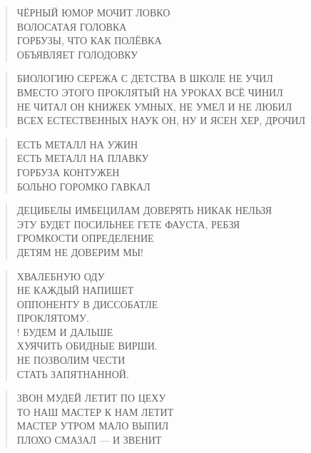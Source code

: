 \poemtitle{***}
\begin{verse}
ЧЁРНЫЙ ЮМОР МОЧИТ ЛОВКО\\
ВОЛОСАТАЯ ГОЛОВКА\\
ГОРБУЗЫ, ЧТО КАК ПОЛЁВКА\\
ОБЪЯВЛЯЕТ ГОЛОДОВКУ
\end{verse}

\poemtitle{***}
\begin{verse}
БИОЛОГИЮ СЕРЕЖА С ДЕТСТВА В ШКОЛЕ НЕ УЧИЛ\\
ВМЕСТО ЭТОГО ПРОКЛЯТЫЙ НА УРОКАХ ВСЁ ЧИНИЛ\\
НЕ ЧИТАЛ ОН КНИЖЕК УМНЫХ, НЕ УМЕЛ И НЕ ЛЮБИЛ\\
ВСЕХ ЕСТЕСТВЕННЫХ НАУК ОН, НУ И ЯСЕН ХЕР, ДРОЧИЛ
\end{verse}

\poemtitle{***}
\begin{verse}
ЕСТЬ МЕТАЛЛ НА УЖИН\\
ЕСТЬ МЕТАЛЛ НА ПЛАВКУ\\
ГОРБУЗА КОНТУЖЕН\\
БОЛЬНО ГОРОМКО ГАВКАЛ
\end{verse}

\poemtitle{***}
\begin{verse}
ДЕЦИБЕЛЫ ИМБЕЦИЛАМ ДОВЕРЯТЬ НИКАК НЕЛЬЗЯ\\
ЭТУ БУДЕТ ПОСИЛЬНЕЕ ГЕТЕ ФАУСТА, РЕБЗЯ\\
ГРОМКОСТИ ОПРЕДЕЛЕНИЕ\\
ДЕТЯМ НЕ ДОВЕРИМ МЫ!
\end{verse}

\poemtitle{***}
\begin{verse}
ХВАЛЕБНУЮ ОДУ \\
НЕ КАЖДЫЙ НАПИШЕТ\\
ОППОНЕНТУ В ДИССОБАТЛЕ\\
ПРОКЛЯТОМУ.\\!
БУДЕМ И ДАЛЬШЕ \\
ХУЯЧИТЬ ОБИДНЫЕ ВИРШИ.\\
НЕ ПОЗВОЛИМ ЧЕСТИ\\
СТАТЬ ЗАПЯТНАННОЙ.
\end{verse}

\poemtitle{***}
\begin{verse}
ЗВОН МУДЕЙ ЛЕТИТ ПО ЦЕХУ\\
ТО НАШ МАСТЕР К НАМ ЛЕТИТ\\
МАСТЕР УТРОМ МАЛО ВЫПИЛ\\
ПЛОХО СМАЗАЛ — И ЗВЕНИТ
\end{verse}

